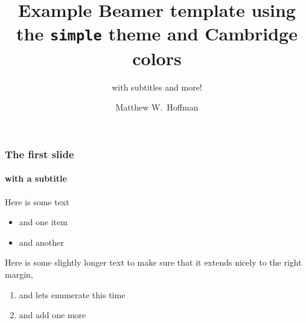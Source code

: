 \documentclass[t]{beamer}
\title{Example Beamer template using the \texttt{simple} theme and Cambridge
colors}
\subtitle{with subtitles and more!}
\author{Matthew W.~Hoffman}
\institute{University of Cambridge}
\begin{document}
\maketitle

\begin{frame}
    \frametitle{The first slide}
    \framesubtitle{with a subtitle}

    Here is some text
    \begin{itemize}
        \item and one item
        \item and another
    \end{itemize}

    \vspace{1em}
    Here is some slightly longer text to make sure that it extends nicely to 
    the right margin,
    \begin{enumerate}
        \item and lets enumerate this time
        \item and add one more
    \end{enumerate}
\end{frame}

\end{document}
